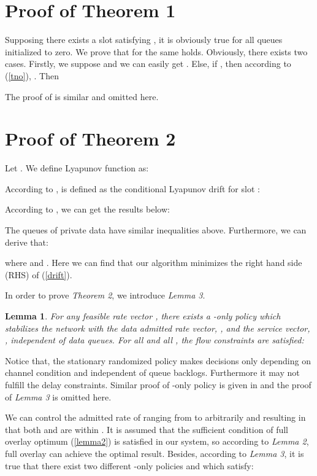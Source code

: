 \documentclass[journal]{IEEEtran}
\newtheorem{Lemma}{Lemma}
\begin{document}
\appendices
\section{Proof of Theorem 1}
Supposing there exists a slot  satisfying  , it is obviously true for all queues initialized to
zero. We prove that for  the same holds. Obviously, there exists two cases. Firstly, we suppose  and we can easily get . Else, if , then
according to (\ref{tno}), . Then 

 The  proof of  is similar and omitted here.

\section{Proof of Theorem 2}
Let . We define Lyapunov function  as:



 According to \cite{neely2010stochastic},  is defined as the conditional Lyapunov drift for slot
 :
 
 According to , we can get the results below:




The queues of private data have similar inequalities above. Furthermore, we can derive that:

where 
and . Here we can find
that our algorithm minimizes the right hand side (RHS) of (\ref{drift}).

In order to prove \emph{Theorem 2}, we introduce \emph{Lemma 3}.

\begin{Lemma}
For any feasible rate vector , there exists a -only policy  which stabilizes
the network with the data admitted rate vector, , and the service vector, , independent of data queues. For all  and all , the flow constraints are satisfied:


\end{Lemma}

Notice that, the stationary randomized policy  makes decisions only depending on channel condition and independent of
queue backlogs. Furthermore it may not fulfill the delay constraints. Similar proof of -only policy is given in \cite{georgiadis2006resource} and the proof of \emph{Lemma 3} is omitted here.

We can control the admitted rate of  ranging from  to
 arbitrarily and resulting in that both  and  are
within .
It is assumed that the sufficient condition of full overlay optimum (\ref{lemma2}) is satisfied in our system,  so according to
\emph{Lemma 2}, full overlay can achieve the optimal result. Besides, according to \emph{Lemma 3}, it is true that there
exist two different -only policies  and  which satisfy:
\end{document}
